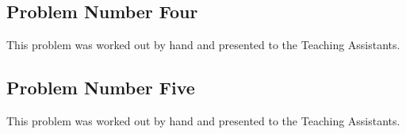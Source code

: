 \documentclass[paper=a4, fontsize=11pt]{scrartcl} %
\numberwithin{equation}{section} %
\numberwithin{figure}{section} %
\numberwithin{table}{section} %
\begin{document}

\subsection{Problem Number Four}

This problem was worked out by hand and presented to the Teaching Assistants.


\subsection{Problem Number Five}

This problem was worked out by hand and presented to the Teaching Assistants.


\end{document}
